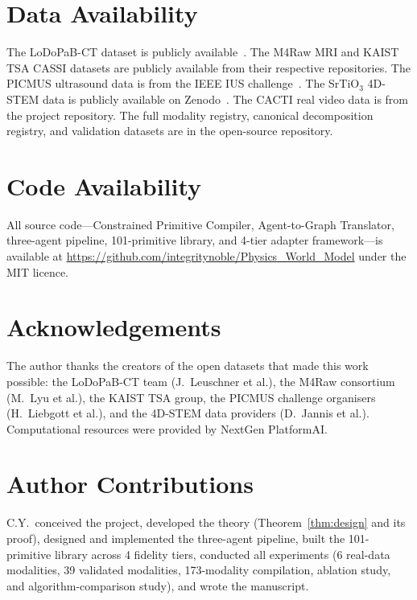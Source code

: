 \documentclass[11pt,a4paper]{article}
\begin{document}
\section*{Data Availability}

The LoDoPaB-CT dataset is publicly available~\cite{leuschner2021}.  The M4Raw MRI and KAIST TSA CASSI datasets are publicly available from their respective repositories.  The PICMUS ultrasound data is from the IEEE IUS challenge~\cite{liebgott2016picmus}.  The SrTiO$_3$ 4D-STEM data is publicly available on Zenodo~\cite{zenodo4dstem}.  The CACTI real video data is from the project repository.  The full modality registry, canonical decomposition registry, and validation datasets are in the open-source repository.

\section*{Code Availability}

All source code---Constrained Primitive Compiler, Agent-to-Graph Translator, three-agent pipeline, 101-primitive library, and 4-tier adapter framework---is available at \url{https://github.com/integritynoble/Physics_World_Model} under the MIT licence.

\section*{Acknowledgements}

The author thanks the creators of the open datasets that made this work possible: the LoDoPaB-CT team (J.~Leuschner et al.), the M4Raw consortium (M.~Lyu et al.), the KAIST TSA group, the PICMUS challenge organisers (H.~Liebgott et al.), and the 4D-STEM data providers (D.~Jannis et al.).  Computational resources were provided by NextGen PlatformAI.

\section*{Author Contributions}

C.Y.\ conceived the project, developed the theory (Theorem~\ref{thm:design} and its proof), designed and implemented the three-agent pipeline, built the 101-primitive library across 4 fidelity tiers, conducted all experiments (6 real-data modalities, 39 validated modalities, 173-modality compilation, ablation study, and algorithm-comparison study), and wrote the manuscript.
\end{document}
